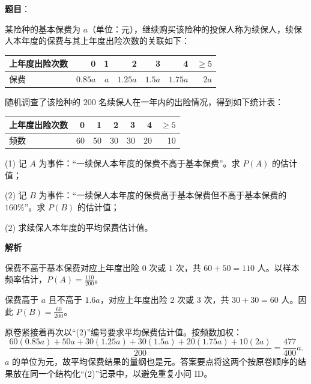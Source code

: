 \begin{answer}

\textbf{题目}：

某险种的基本保费为 $a$（单位：元），继续购买该险种的投保人称为续保人，续保人本年度的保费与其上年度出险次数的关联如下：

\begin{center}
\begin{tabular}{lrrrrrr}
\toprule
上年度出险次数 & 0 & 1 & 2 & 3 & 4 & $\geqslant5$ \\
\midrule
保费 & $0.85a$ & $a$ & $1.25a$ & $1.5a$ & $1.75a$ & $2a$ \\
\bottomrule
\end{tabular}
\end{center}

随机调查了该险种的 $200$ 名续保人在一年内的出险情况，得到如下统计表：

\begin{center}
\begin{tabular}{lrrrrrr}
\toprule
上年度出险次数 & 0 & 1 & 2 & 3 & 4 & $\geqslant5$ \\
\midrule
频数 & 60 & 50 & 30 & 30 & 20 & 10 \\
\bottomrule
\end{tabular}
\end{center}

(1) 记 $A$ 为事件：“一续保人本年度的保费不高于基本保费”。求 $P(A)$ 的估计值；

(2) 记 $B$ 为事件：“一续保人本年度的保费高于基本保费但不高于基本保费的 $160\%$”。求 $P(B)$ 的估计值；

(2) 求续保人本年度的平均保费估计值。

\textbf{解析}


保费不高于基本保费对应上年度出险 $0$ 次或 $1$ 次，共 $60+50=110$ 人。以样本频率估计，$P(A)=\frac{110}{200}$。


保费高于 $a$ 且不高于 $1.6a$，对应上年度出险 $2$ 次或 $3$ 次，共 $30+30=60$ 人。因此 $P(B)=\frac{60}{200}$。


原卷紧接着再次以“(2)”编号要求平均保费估计值。按频数加权：
\nopagebreak[4]
\[
\frac{60(0.85a)+50a+30(1.25a)+30(1.5a)+20(1.75a)+10(2a)}{200}
=\frac{477}{400}a.
\]
$a$ 的单位为元，故平均保费结果的量纲也是元。答案要点将这两个按原卷顺序的结果放在同一个结构化“(2)”记录中，以避免重复小问 ID。



\end{answer}
